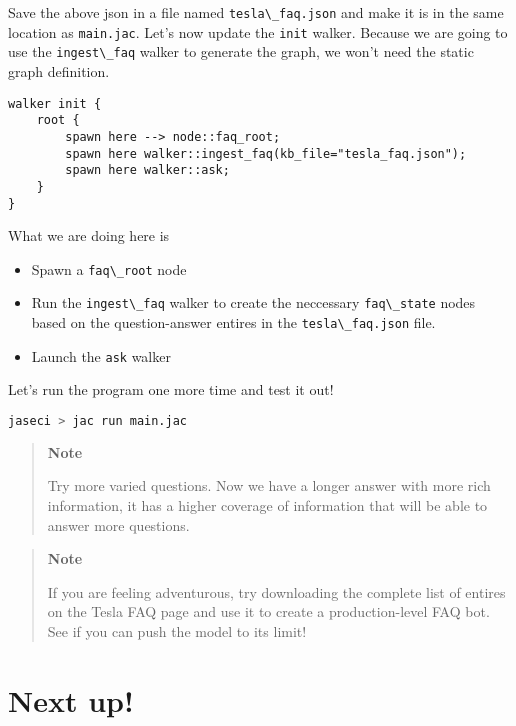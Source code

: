Save the above json in a file named
\passthrough{\lstinline!tesla\_faq.json!} and make it is in the same
location as \passthrough{\lstinline!main.jac!}. Let's now update the
\passthrough{\lstinline!init!} walker. Because we are going to use the
\passthrough{\lstinline!ingest\_faq!} walker to generate the graph, we
won't need the static graph definition.

\begin{lstlisting}
walker init {
    root {
        spawn here --> node::faq_root;
        spawn here walker::ingest_faq(kb_file="tesla_faq.json");
        spawn here walker::ask;
    }
}
\end{lstlisting}

What we are doing here is

\begin{itemize}
\tightlist
\item
  Spawn a \passthrough{\lstinline!faq\_root!} node
\item
  Run the \passthrough{\lstinline!ingest\_faq!} walker to create the
  neccessary \passthrough{\lstinline!faq\_state!} nodes based on the
  question-answer entires in the
  \passthrough{\lstinline!tesla\_faq.json!} file.
\item
  Launch the \passthrough{\lstinline!ask!} walker
\end{itemize}

Let's run the program one more time and test it out!

\begin{lstlisting}[language=bash]
jaseci > jac run main.jac
\end{lstlisting}

\begin{quote}
\textbf{Note}

Try more varied questions. Now we have a longer answer with more rich
information, it has a higher coverage of information that will be able
to answer more questions.
\end{quote}

\begin{quote}
\textbf{Note}

If you are feeling adventurous, try downloading the complete list of
entires on the Tesla FAQ page and use it to create a production-level
FAQ bot. See if you can push the model to its limit!
\end{quote}

\hypertarget{next-up}{%
\section{Next up!}\label{next-up}}


